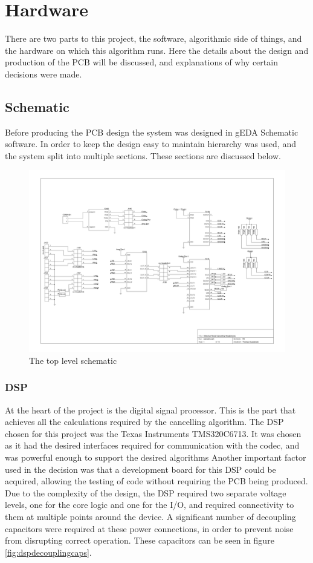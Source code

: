 \section{Hardware}

There are two parts to this project, the software, algorithmic side of things, and the hardware on which this algorithm runs.
Here the details about the design and production of the PCB will be discussed, and explanations of why certain decisions were made.

\subsection{Schematic}
\label{sec:imple:hard:sch}
Before producing the PCB design the system was designed in gEDA Schematic software.
In order to keep the design easy to maintain hierarchy was used, and the system split into multiple sections.
These sections are discussed below.

\begin{figure}[H]
	\centering
	\includegraphics[width=\textwidth]{./img/overview.png}
	\caption{The top level schematic}
	\label{fig:overviewsch}
\end{figure}

\subsubsection{DSP}
At the heart of the project is the digital signal processor.
This is the part that achieves all the calculations required by the cancelling algorithm.
The DSP chosen for this project was the Texas Instruments TMS320C6713.
It was chosen as it had the desired interfaces required for communication with the codec, and was powerful enough to support the desired algorithms
Another important factor used in the decision was that a development board for this DSP could be acquired, allowing the testing of code without requiring the PCB being produced.
Due to the complexity of the design, the DSP required two separate voltage levels, one for the core logic and one for the I/O, and required connectivity to them at multiple points around the device.
A significant number of decoupling capacitors were required at these power connections, in order to prevent noise from disrupting correct operation.
These capacitors can be seen in figure \ref{fig:dspdecouplingcaps}.

